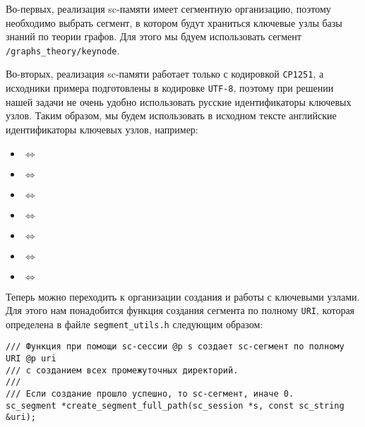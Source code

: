 Во-первых, реализация sc-памяти имеет сегментную организацию, поэтому
необходимо выбрать сегмент, в котором будут храниться ключевые узлы
базы знаний по теории графов. Для этого мы бдуем использовать сегмент
\verb|/graphs_theory/keynode|.

Во-вторых, реализация sc-памяти работает только с кодировкой
\verb|CP1251|, а исходники примера подготовлены в кодировке
\verb|UTF-8|, поэтому при решении нашей задачи не очень удобно
использовать русские идентификаторы ключевых узлов. Таким образом, мы
будем использовать в исходном тексте английские идентификаторы
ключевых узлов, например:
\begin{itemize}
\item {} $\Leftrightarrow$ 
\item {} $\Leftrightarrow$ 
\item {} $\Leftrightarrow$ 
\item {} $\Leftrightarrow$ 
\item {} $\Leftrightarrow$ 
\item {} $\Leftrightarrow$ 
\item {} $\Leftrightarrow$ 
\end{itemize}

Теперь можно переходить к организации создания и работы с ключевыми
узлами. Для этого нам понадобится функция создания сегмента по полному
\verb|URI|, которая определена в файле \verb|segment_utils.h|
следующим образом:
\begin{lstlisting}[texcl]
/// Функция при помощи sc-сессии @p s создает sc-сегмент по полному URI @p uri
/// c созданием всех промежуточных директорий.
///
/// Если создание прошло успешно, то sc-сегмент, иначе 0.
sc_segment *create_segment_full_path(sc_session *s, const sc_string &uri);
\end{lstlisting}

